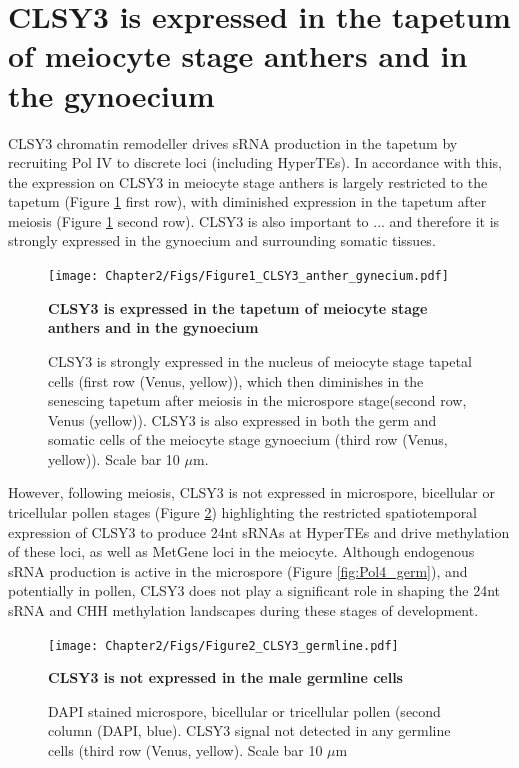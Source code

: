 \section{CLSY3 is expressed in the tapetum of meiocyte stage anthers and in the gynoecium}

CLSY3 chromatin remodeller drives sRNA production in the tapetum \citep{RN187} by recruiting Pol IV to discrete loci (including HyperTEs)\citep{RN23}. In accordance with this, the expression on CLSY3 in meiocyte stage anthers is largely restricted to the tapetum (Figure \ref{fig:CLSY3_anther} first row), with diminished expression in the tapetum after meiosis (Figure \ref{fig:CLSY3_anther} second row). CLSY3 is also important to ... and therefore it is strongly expressed in the gynoecium and surrounding somatic tissues.

\begin{figure}[htbp!] 
\centering    
    \texttt{[image: Chapter2/Figs/Figure1\_CLSY3\_anther\_gynecium.pdf]}
\caption{\textbf{CLSY3 is expressed in the tapetum of meiocyte stage anthers and in the gynoecium}}
\label{fig:CLSY3_anther}
\captionsetup{font=small}
    \caption*{CLSY3 is strongly expressed in the nucleus of meiocyte stage tapetal cells (first row (Venus, yellow)), which then diminishes in the senescing tapetum after meiosis in the microspore stage(second row, Venus (yellow)). CLSY3 is also expressed in both the germ and somatic cells of the meiocyte stage gynoecium (third row (Venus, yellow)). Scale bar 10 $\mu$m.}
\end{figure}

However, following meiosis, CLSY3 is not expressed in microspore, bicellular or tricellular pollen stages (Figure \ref{fig:CLSY3_germ}) highlighting the restricted spatiotemporal expression of CLSY3 to produce 24nt sRNAs at HyperTEs and drive methylation of these loci, as well as MetGene loci in the meiocyte. Although endogenous sRNA production is active in the microspore (Figure \ref{fig:Pol4_germ}), and potentially in pollen, CLSY3 does not play a significant role in shaping the 24nt sRNA and CHH methylation landscapes during these stages of development.

\begin{figure}[htbp!] 
\centering    
    \texttt{[image: Chapter2/Figs/Figure2\_CLSY3\_germline.pdf]}
\caption{\textbf{CLSY3 is not expressed in the male germline cells}}
\label{fig:CLSY3_germ}
\captionsetup{font=small}
    \caption*{DAPI stained microspore, bicellular or tricellular pollen (second column (DAPI, blue). CLSY3 signal not detected in any germline cells (third row (Venus, yellow). Scale bar 10 $\mu$m}
\end{figure}

